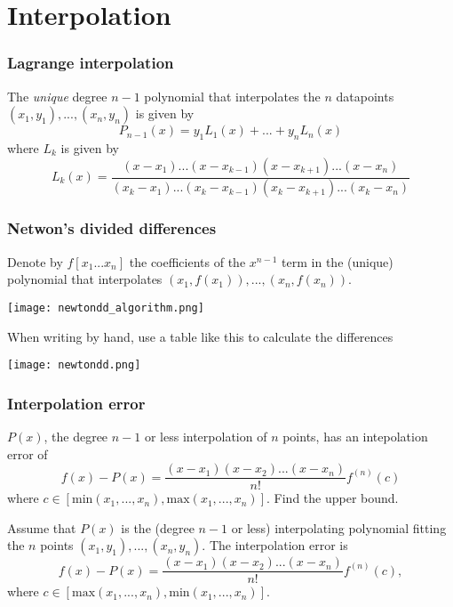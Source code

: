 \section{Interpolation}
\subsubsection{Lagrange interpolation}
The \textit{unique} degree $n-1$ polynomial that interpolates the $n$ datapoints $(x_1, y_1), ..., (x_n, y_n)$ is given by
$$
P_{n-1}(x) = y_1L_1(x) + ... + y_nL_n(x)
$$
where $L_k$ is given by
$$
L_k(x) = \frac{(x-x_1)...(x-x_{k-1})(x-x_{k+1})...(x-x_n)}{(x_k-x_1)...(x_k - x_{k-1})(x_k - x_{k+1})...(x_k-x_n)}
$$

\subsubsection{Netwon's divided differences}
\begin{definition}
Denote by $f[x_1...x_n]$ the coefficients of the $x^{n-1}$ term in the (unique) polynomial that interpolates $(x_1, f(x_1)), ..., (x_n,f(x_n))$.
\end{definition}

\begin{center}
\texttt{[image: newtondd\_algorithm.png]}
\end{center}

When writing by hand, use a table like this to calculate the differences
\begin{center}
\texttt{[image: newtondd.png]}
\end{center}

\subsubsection{Interpolation error}

\begin{theorem}
$P(x)$, the degree $n-1$ or less interpolation of $n$ points, has an intepolation error of
$$
f(x) - P(x) = \frac{(x-x_1)(x-x_2)...(x-x_n)}{n!}f^{(n)}(c)
$$
where $c \in [\text{min}(x_1,...,x_n), \text{max}(x_1,...,x_n)]$. Find the upper bound.
\end{theorem}

\begin{theorem}
Assume that $P(x)$ is the (degree $n-1$ or less) interpolating polynomial fitting the $n$ points $(x_1,y_1),...,(x_n,y_n)$. The interpolation error is
$$
f(x)-P(x) = \frac{(x-x_1)(x-x_2)...(x-x_n)}{n!}f^{(n)}(c),
$$
where $c \in [\text{max}(x_1,...,x_n), \text{min}(x_1,...,x_n)]$.
\end{theorem}

